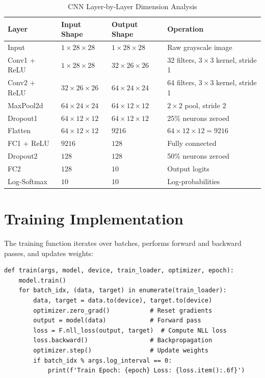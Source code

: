 \documentclass[12pt,a4paper,openany]{report}
\begin{document}
\begin{table}[H]
\centering
\begin{tabular}{|l|l|l|p{5.5cm}|}
\hline
\textbf{Layer} & \textbf{Input Shape} & \textbf{Output Shape} & \textbf{Operation} \\
\hline
Input          & $1 \times 28 \times 28$  & $1 \times 28 \times 28$  & Raw grayscale image \\
Conv1 + ReLU   & $1 \times 28 \times 28$  & $32 \times 26 \times 26$ & 32 filters, $3\times3$ kernel, stride 1 \\
Conv2 + ReLU   & $32 \times 26 \times 26$ & $64 \times 24 \times 24$ & 64 filters, $3\times3$ kernel, stride 1 \\
MaxPool2d      & $64 \times 24 \times 24$ & $64 \times 12 \times 12$ & $2\times2$ pool, stride 2 \\
Dropout1       & $64 \times 12 \times 12$ & $64 \times 12 \times 12$ & 25\% neurons zeroed \\
Flatten        & $64 \times 12 \times 12$ & $9216$                   & $64 \times 12 \times 12 = 9216$ \\
FC1 + ReLU     & $9216$                   & $128$                    & Fully connected \\
Dropout2       & $128$                    & $128$                    & 50\% neurons zeroed \\
FC2            & $128$                    & $10$                     & Output logits \\
Log-Softmax    & $10$                     & $10$                     & Log-probabilities \\
\hline
\end{tabular}
\caption{CNN Layer-by-Layer Dimension Analysis}
\end{table}

\section{Training Implementation}

The training function iterates over batches, performs forward and backward passes, and updates weights:

\begin{verbatim}
def train(args, model, device, train_loader, optimizer, epoch):
    model.train()
    for batch_idx, (data, target) in enumerate(train_loader):
        data, target = data.to(device), target.to(device)
        optimizer.zero_grad()           # Reset gradients
        output = model(data)            # Forward pass
        loss = F.nll_loss(output, target)  # Compute NLL loss
        loss.backward()                 # Backpropagation
        optimizer.step()                # Update weights
        if batch_idx % args.log_interval == 0:
            print(f'Train Epoch: {epoch} Loss: {loss.item():.6f}')
\end{verbatim}
\end{document}
